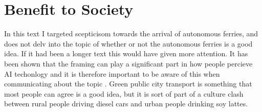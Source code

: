\documentclass{iopconfser}
\begin{document}
\section*{Benefit to Society}
In this text I targeted scepticisom towards the arrival of autonomous ferries, and does not delv into the topic of whether or not the autonomous ferries is a good idea.
If it had been a longer text this would have given more attention.
It has been shown that the framing can play a significant part in how people percieve AI techonlogy and it is therefore important to be aware of this when communicating about the topic \cite{bingamanSiriShowMe2021}.
Green public city transport is something that most people can agree is a good idea, but it is sort of part of a culture clash between rural people driving diesel cars and urban people drinking soy lattes.


\pagebreak
\printbibliography
\end{document}
